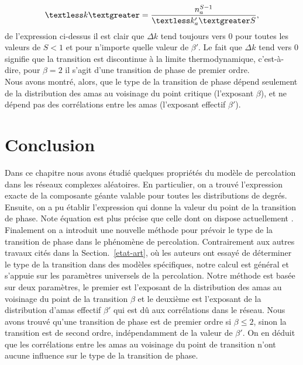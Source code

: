 \begin{equation}
\km=\frac{n_a^{S-1}}{\kmap S},
\end{equation}
de l'expression ci-dessus il est clair que  $\Delta k$  tend toujours vers $0$ pour toutes les valeurs de $S<1$ et pour n'importe quelle valeur de $\beta'$. Le fait que $\Delta k$ tend vers $0$  signifie que la transition est discontinue à la limite thermodynamique, c'est-à-dire, pour $\beta=2$ il s'agit d'une transition de phase de premier ordre.\\
Nous avons montré, alors, que le type de la transition de phase dépend seulement de la distribution des amas au voisinage du point critique (l'exposant $\beta$), et ne dépend pas des corrélations entre les amas (l'exposant effectif $\beta'$). \\ 
\section{Conclusion}
Dans ce chapitre nous avons étudié quelques propriétés du modèle de percolation dans les réseaux complexes aléatoires. En particulier, on a trouvé l'expression exacte de la composante géante valable pour toutes les distributions de degrés. Ensuite, on a pu établir l'expression qui donne la valeur du point de la transition de phase. Note équation est plus précise que celle dont on dispose actuellement \cite{Cho-al2010}. Finalement on a introduit une nouvelle méthode pour prévoir le type de la transition de phase dans le phénomène de percolation. Contrairement aux autres travaux cités dans la  Section.~\ref{etat-art}, où les auteurs ont essayé de déterminer le type de la transition dans des modèles spécifiques, notre calcul est général et s'appuie sur les paramètres universels de la percolation.  Notre méthode est basée sur deux paramètres, le premier est l'exposant de la distribution des amas au voisinage du point de la transition $\beta$ et le deuxième est l'exposant de la distribution d'amas  effectif $\beta'$ qui est dû aux corrélations dans le réseau. Nous avons trouvé qu'une transition de phase est de premier ordre si $\beta\leq2$, sinon la transition est de second ordre, indépendamment de la valeur de $\beta'$. On en déduit que les corrélations entre les amas au voisinage du point de transition n'ont aucune influence sur le type de la transition de phase.

\let\cleardoublepage\clearpage
